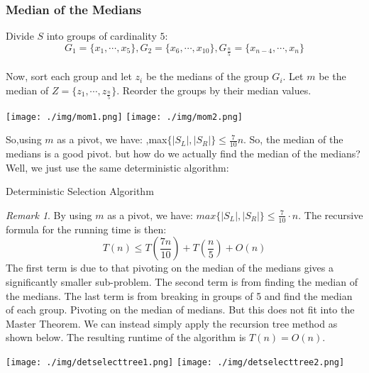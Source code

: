 \documentclass[11pt, a4paper, oneside]{book}
\DeclarePairedDelimiter\ceil{\lceil}{\rceil}
\theoremstyle{theoremdd}
\theoremstyle{remark}
\newtheorem*{remark}{Remark}
\begin{document}
\subsubsection*{Median of the Medians}
Divide $S$ into groups of cardinality $5$: \\
\[
G_{1}=\{x_{1},\cdots,x_{5}\}, G_{2}=\{x_{6},\cdots,x_{10}\}, G_{\frac{n}{5}}=\{x_{n-4},\cdots,x_{n}\}
\]\\
Now, sort each group and let $z_{i}$ be the medians of the group $G_{i}$. Let $m$ be the median of $Z=\{z_{1},\cdots,z_{\frac{n}{5}}\}$. Reorder the groups by their median values. 
\begin{center}
\texttt{[image: ./img/mom1.png]}
\texttt{[image: ./img/mom2.png]}
\end{center}

So,using $m$ as a pivot, we have: ,max$\{|S_{L}|,|S_{R}|\}\leq \frac{7}{10}n$. So, the median of the medians is a good pivot. but how do we actually find the median of the medians? Well, we just use the same deterministic algorithm: \\

\begin{algorithm}[H]
\SetAlgoLined
{}
\caption{Deterministic Selection Algorithm}
\end{algorithm}
\begin{remark}
By using $m$ as a pivot, we have: $max\{|S_{L}|,|S_{R}|\} \leq \frac{7}{10}\cdot n$. The recursive formula for the running time is then: \\
\[
	T(n) \leq T(\frac{7n}{10}) + T(\frac{n}{5}) + O(n)
\]
The first term is due to that pivoting on the median of the medians gives a significantly smaller sub-problem. The second term is from finding the median of the medians. The last term is from breaking in groups of 5 and find the median of each group. Pivoting on the median of medians. But this does not fit into the Master Theorem. We can instead simply apply the recursion tree method as shown below. The resulting runtime of the algorithm is $T(n) = O(n)$.
\begin{center}
\texttt{[image: ./img/detselecttree1.png]}
\texttt{[image: ./img/detselecttree2.png]}
\end{center}
\end{remark}
\newpage
\end{document}
